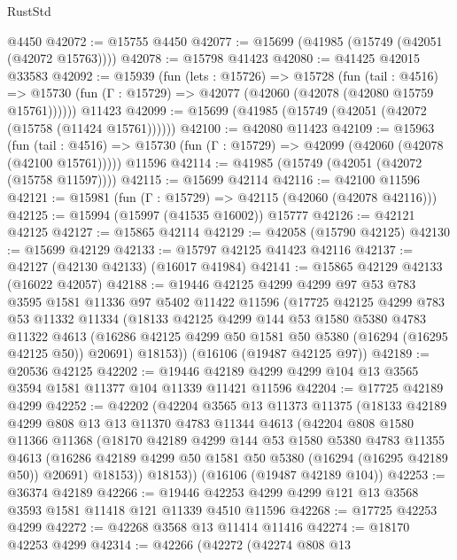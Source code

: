 \begin{lexlean}{RustStd}
\begin{coremodule}
    @4450
@42072 := @15755 @4450
@42077 := @15699 (@41985 (@15749 (@42051 (@42072 @15763))))
@42078 := @15798 @41423
@42080 := @41425 @42015 @33583
@42092 := @15939
    (fun (lets : @15726) =>
    @15728
      (fun (tail : @4516) =>
      @15730 (fun (Γ : @15729) => @42077 (@42060 (@42078 (@42080 @15759 @15761))))))
    @11423
@42099 := @15699 (@41985 (@15749 (@42051 (@42072 (@15758 (@11424 @15761))))))
@42100 := @42080 @11423
@42109 := @15963
    (fun (tail : @4516) => @15730 (fun (Γ : @15729) => @42099 (@42060 (@42078 (@42100 @15761)))))
    @11596
@42114 := @41985 (@15749 (@42051 (@42072 (@15758 @11597))))
@42115 := @15699 @42114
@42116 := @42100 @11596
@42121 := @15981 (fun (Γ : @15729) => @42115 (@42060 (@42078 @42116)))
@42125 := @15994 (@15997 (@41535 @16002)) @15777
@42126 := @42121 @42125
@42127 := @15865 @42114
@42129 := @42058 (@15790 @42125)
@42130 := @15699 @42129
@42133 := @15797 @42125 @41423 @42116
@42137 := @42127 (@42130 @42133) (@16017 @41984)
@42141 := @15865 @42129 @42133 (@16022 @42057)
@42188 := @19446
    @42125
    @4299
    @4299
    @97
    @53
    @783
    @3595
    @1581
    @11336
    @97
    @5402
    @11422
    @11596
    (@17725
      @42125
      @4299
      @783
      @53
      @11332
      @11334
      (@18133
        @42125
        @4299
        @144
        @53
        @1580
        @5380
        @4783
        @11322
        @4613
        (@16286 @42125 @4299 @50 @1581 @50 @5380 (@16294 (@16295 @42125 @50)) @20691)
        @18153))
    (@16106 (@19487 @42125 @97))
@42189 := @20536 @42125
@42202 := @19446 @42189 @4299 @4299 @104 @13 @3565 @3594 @1581 @11377 @104 @11339 @11421 @11596
@42204 := @17725 @42189 @4299
@42252 := @42202
    (@42204
      @3565
      @13
      @11373
      @11375
      (@18133
        @42189
        @4299
        @808
        @13
        @13
        @11370
        @4783
        @11344
        @4613
        (@42204
          @808
          @1580
          @11366
          @11368
          (@18170
            @42189
            @4299
            @144
            @53
            @1580
            @5380
            @4783
            @11355
            @4613
            (@16286 @42189 @4299 @50 @1581 @50 @5380 (@16294 (@16295 @42189 @50)) @20691)
            @18153))
        @18153))
    (@16106 (@19487 @42189 @104))
@42253 := @36374 @42189
@42266 := @19446 @42253 @4299 @4299 @121 @13 @3568 @3593 @1581 @11418 @121 @11339 @4510 @11596
@42268 := @17725 @42253 @4299
@42272 := @42268 @3568 @13 @11414 @11416
@42274 := @18170 @42253 @4299
@42314 := @42266
    (@42272
      (@42274
        @808
        @13

\end{coremodule}
\end{lexlean}
